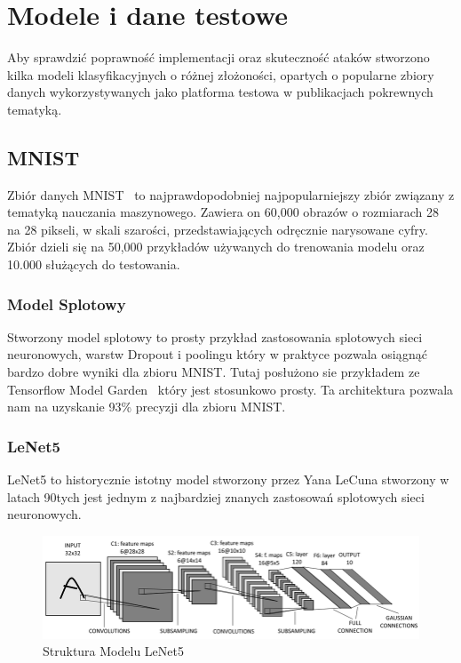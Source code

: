 \documentclass[
    left=2.5cm,         %
    right=2.5cm,        %
    top=2.5cm,          %
    bottom=3cm,         %
    bindingoffset=6mm,  %
    nohyphenation=false %
]{eiti/eiti-thesis}
\begin{document}
\newpage
\section{Modele i dane testowe}
Aby sprawdzić poprawność implementacji oraz skuteczność ataków stworzono
kilka modeli klasyfikacyjnych o różnej złożoności, opartych o popularne zbiory danych
wykorzystywanych jako platforma testowa w publikacjach pokrewnych tematyką.

    \subsection{MNIST}
    Zbiór danych MNIST~\cite{mnist} to najprawdopodobniej najpopularniejszy zbiór związany z
    tematyką nauczania maszynowego.
    Zawiera on 60,000 obrazów o rozmiarach 28 na 28 pikseli, w skali szarości, przedstawiających
    odręcznie narysowane cyfry. Zbiór dzieli się na 50,000 przykładów używanych do
    trenowania modelu oraz 10.000 służących do testowania.

        \subsubsection{Model Splotowy}
        Stworzony model splotowy to prosty przykład zastosowania splotowych sieci neuronowych, warstw Dropout i poolingu
        który w praktyce pozwala osiągnąć bardzo dobre wyniki dla zbioru MNIST. Tutaj posłużono sie przykładem ze
        Tensorflow Model Garden~\cite{tensorflow_model_garden} który jest stosunkowo prosty. Ta architektura pozwala nam
        na uzyskanie 93\% precyzji dla zbioru MNIST.


        \subsubsection{LeNet5}
        LeNet5 to historycznie istotny model stworzony przez Yana LeCuna stworzony w latach 90tych
        jest jednym z najbardziej znanych zastosowań splotowych sieci neuronowych.
       \begin{figure}[H]
           \centring
            \includegraphics[width=\textwidth]{eiti/lenet5_overview.png}
            \caption{Struktura Modelu LeNet5\cite{LeNet5Diagram}}
       \end{figure}
\end{document}
